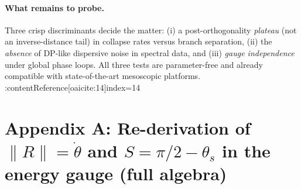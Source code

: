 \documentclass[11pt,letterpaper]{article}
\begin{document}
\paragraph{What remains to probe.}
Three crisp discriminants decide the matter: (i) a post-orthogonality \emph{plateau} (not an inverse-distance tail) in collapse rates versus branch separation, (ii) the \emph{absence} of DP-like dispersive noise in spectral data, and (iii) \emph{gauge independence} under global phase loops. All three tests are parameter-free and already compatible with state-of-the-art mesoscopic platforms. :contentReference[oaicite:14]{index=14}

\appendix

\section*{Appendix A: Re-derivation of \texorpdfstring{$\|R\|=\dot\theta$}{||R||=θdot} and \texorpdfstring{$S=\pi/2-\theta_s$}{S=π/2−θs} in the energy gauge (full algebra)}
\end{document}
